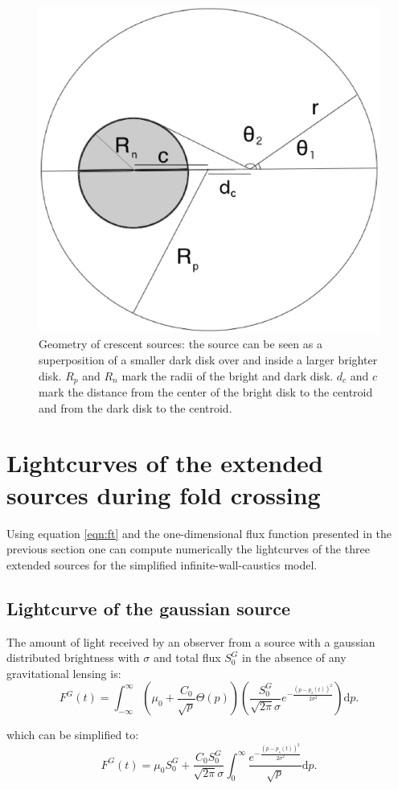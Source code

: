\documentclass[usenatbib]{mn2e}
\begin{document}
\begin{figure}
\includegraphics[width = .49\textwidth]{figures/figure_rhalf2.eps}
\caption{\label{fig:geom_crescent} Geometry of crescent sources: the source can be seen as a superposition
 of a smaller dark disk over and inside a larger brighter disk. $R_p$ and $R_n$ mark the radii of the 
bright and dark disk. $d_c$ and $c$ mark the distance from the center of the bright disk to the 
centroid and from the dark disk to the centroid.  }
\end{figure}


\section{Lightcurves of the extended sources during fold crossing}\label{sec:fold-crossing}

Using equation \ref{eqn:ft} and the one-dimensional flux function
presented in the previous section one can compute numerically the
lightcurves of the three extended sources for the simplified
infinite-wall-caustics model.

\subsection{Lightcurve of the gaussian source}

The amount of light received by an observer from a source 
with a gaussian distributed brightness with $\sigma$ and total flux $S_0^G$ in the absence of any gravitational lensing is:
\begin{equation}
 F^G(t) = \int_{-\infty}^\infty  \left( \mu_0 + \frac{C_0}{\sqrt{p}} \Theta \left( p \right) \right) \left( \frac{S_0^G}{\sqrt{2 \pi} \sigma} e^{-\frac{(p-p_s(t))^2}{2 \sigma^2}} \right) \mathrm{d}p.
\end{equation}

which can be simplified to:
\begin{equation}
 F^G(t) = \mu_0 S_0^G + \frac{C_0 S_0^G}{\sqrt{2\pi} \sigma} \int_{0}^\infty \frac{e^{-\frac{(p-p_s(t))^2}{2 \sigma^2}}}{\sqrt{p}} \mathrm{d}p.
\end{equation}
\end{document}
